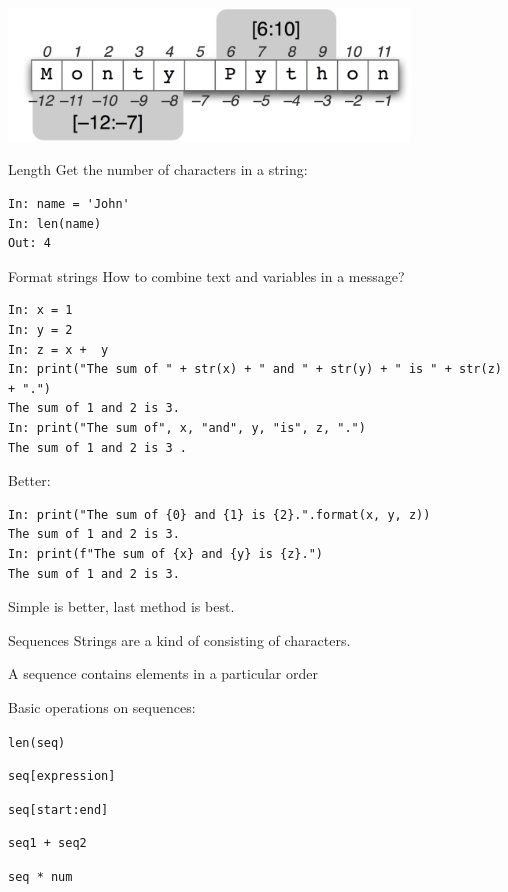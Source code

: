 \documentclass[aspectratio=169,usenames,dvipsnames]{beamer}
\begin{document}
\begin{frame}
    \includegraphics[width=0.8\textwidth]{fig/slices}
\end{frame}

\begin{frame}[fragile]{Length}
Get the number of characters in a string:
\begin{lstlisting}
In: name = 'John'
In: len(name)
Out: 4
\end{lstlisting}
\end{frame}

\begin{frame}[fragile]{Format strings}
How to combine text and variables in a message?
\begin{lstlisting}
In: x = 1
In: y = 2
In: z = x +  y
In: print("The sum of " + str(x) + " and " + str(y) + " is " + str(z) + ".")
The sum of 1 and 2 is 3.
In: print("The sum of", x, "and", y, "is", z, ".")
The sum of 1 and 2 is 3 .
\end{lstlisting}

\pause
Better:
\begin{lstlisting}
In: print("The sum of {0} and {1} is {2}.".format(x, y, z))
The sum of 1 and 2 is 3.
In: print(f"The sum of {x} and {y} is {z}.")
The sum of 1 and 2 is 3.
\end{lstlisting}

Simple is better, last method is best.
\end{frame}

\begin{frame}{Sequences}
    Strings are a kind of 
    consisting of characters.

    \vspace{1em}
    A sequence contains elements in a particular order

    \vspace{1em}
    Basic operations on sequences:
    \begin{description}[concatenation:]
        \item[getting length:]     \texttt{len(seq)}
        \item[indexing:]           \texttt{seq[expression]}
        \item[slicing:]            \texttt{seq[start:end]}
        \item[concatenation:]      \texttt{seq1 + seq2}
        \item[repetition:]         \texttt{seq * num}
    \end{description}
\end{frame}
\end{document}
